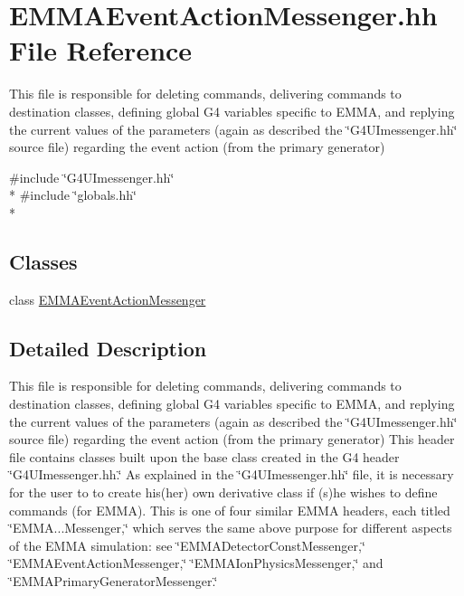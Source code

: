 \hypertarget{EMMAEventActionMessenger_8hh}{\section{E\-M\-M\-A\-Event\-Action\-Messenger.\-hh File Reference}
\label{EMMAEventActionMessenger_8hh}
}


This file is responsible for deleting commands, delivering commands to destination classes, defining global G4 variables specific to E\-M\-M\-A, and replying the current values of the parameters (again as described the \char`\"{}\-G4\-U\-Imessenger.\-hh\char`\"{} source file) regarding the event action (from the primary generator)  


{\ttfamily \#include \char`\"{}G4\-U\-Imessenger.\-hh\char`\"{}}\\*
{\ttfamily \#include \char`\"{}globals.\-hh\char`\"{}}\\*
\subsection*{Classes}
\begin{DoxyCompactItemize}
\item 
class \hyperlink{classEMMAEventActionMessenger}{E\-M\-M\-A\-Event\-Action\-Messenger}
\end{DoxyCompactItemize}


\subsection{Detailed Description}
This file is responsible for deleting commands, delivering commands to destination classes, defining global G4 variables specific to E\-M\-M\-A, and replying the current values of the parameters (again as described the \char`\"{}\-G4\-U\-Imessenger.\-hh\char`\"{} source file) regarding the event action (from the primary generator) This header file contains classes built upon the base class created in the G4 header \char`\"{}\-G4\-U\-Imessenger.\-hh.\char`\"{} As explained in the \char`\"{}\-G4\-U\-Imessenger.\-hh\char`\"{} file, it is necessary for the user to to create his(her) own derivative class if (s)he wishes to define commands (for E\-M\-M\-A). This is one of four similar E\-M\-M\-A headers, each titled \char`\"{}\-E\-M\-M\-A...\-Messenger,\char`\"{} which serves the same above purpose for different aspects of the E\-M\-M\-A simulation\-: see \char`\"{}\-E\-M\-M\-A\-Detector\-Const\-Messenger,\char`\"{} \char`\"{}\-E\-M\-M\-A\-Event\-Action\-Messenger,\char`\"{} \char`\"{}\-E\-M\-M\-A\-Ion\-Physics\-Messenger,\char`\"{} and \char`\"{}\-E\-M\-M\-A\-Primary\-Generator\-Messenger.\char`\"{} 